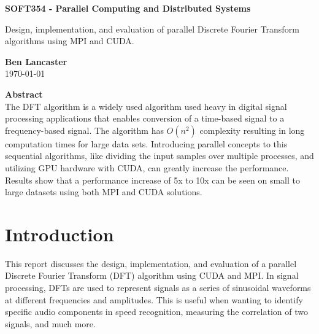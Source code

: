 \documentclass[11pt,a4paper]{article}
\begin{document}
\begin{titlepage}
\begin{center}

\vspace*{3cm}
\Large
\textbf{SOFT354 - Parallel Computing and Distributed Systems}

\vspace{0.4cm}
\large
Design, implementation, and evaluation of parallel Discrete Fourier Transform algorithms using MPI and CUDA.

\vspace{4cm}
\textbf{Ben Lancaster}\\
\today

\vspace{4cm}
\textbf{Abstract}\\
\small
The DFT algorithm is a widely used algorithm used heavy in digital signal processing applications that enables conversion of a time-based signal to a frequency-based signal. The algorithm has $O(n^2)$ complexity resulting in long computation times for large data sets. Introducing parallel concepts to this sequential algorithms, like dividing the input samples over multiple processes, and utilizing GPU hardware with CUDA, can greatly increase the performance. Results show that a performance increase of 5x to 10x can be seen on small to large datasets using both MPI and CUDA solutions. 


\end{center}

\end{titlepage}

\renewcommand*\contentsname{Table of Contents}
\tableofcontents
\newpage

\section{Introduction}
This report discusses the design, implementation, and evaluation of a parallel Discrete Fourier Transform (DFT) algorithm using CUDA and MPI.
In signal processing, DFTs are used to represent signals as a series of sinusoidal waveforms at different frequencies and amplitudes. This is useful when wanting to identify specific audio components in speed recognition, measuring the correlation of two signals, and much more.
\end{document}
